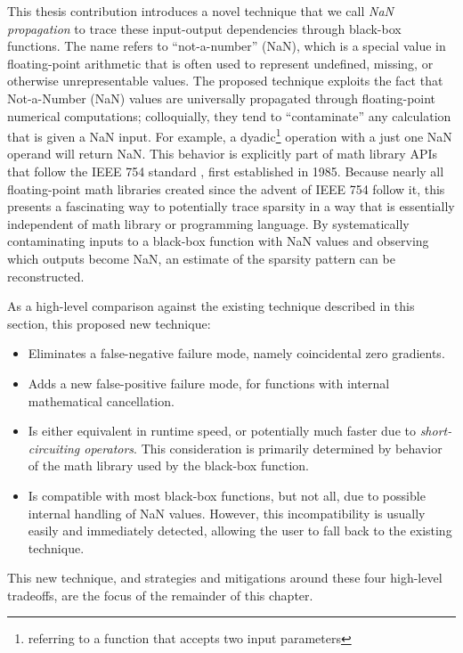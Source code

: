 This thesis contribution introduces a novel technique that we call \textit{NaN propagation} to trace these input-output dependencies through black-box functions. The name refers to ``not-a-number'' (NaN), which is a special value in floating-point arithmetic that is often used to represent undefined, missing, or otherwise unrepresentable values. The proposed technique exploits the fact that Not-a-Number (NaN) values are universally propagated through floating-point numerical computations; colloquially, they tend to ``contaminate'' any calculation that is given a NaN input. For example, a dyadic\footnote{referring to a function that accepts two input parameters} operation with a just one NaN operand will return NaN. This behavior is explicitly part of math library APIs that follow the IEEE 754 standard \cite{ieee754}, first established in 1985. Because nearly all floating-point math libraries created since the advent of IEEE 754 follow it, this presents a fascinating way to potentially trace sparsity in a way that is essentially independent of math library or programming language. By systematically contaminating inputs to a black-box function with NaN values and observing which outputs become NaN, an estimate of the sparsity pattern can be reconstructed.

As a high-level comparison against the existing technique described in this section, this proposed new technique:

\begin{itemize}[noitemsep]
    \item Eliminates a false-negative failure mode, namely coincidental zero gradients.
    \item Adds a new false-positive failure mode, for functions with internal mathematical cancellation.
    \item Is either equivalent in runtime speed, or potentially much faster due to \emph{short-circuiting operators}. This consideration is primarily determined by behavior of the math library used by the black-box function.
    \item Is compatible with most black-box functions, but not all, due to possible internal handling of NaN values. However, this incompatibility is usually easily and immediately detected, allowing the user to fall back to the existing technique.
\end{itemize}

This new technique, and strategies and mitigations around these four high-level tradeoffs, are the focus of the remainder of this chapter.

